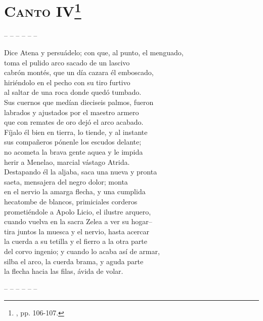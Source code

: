 \section*{\centering\textbf{\textsc{Canto} IV}\footnote{\ehdos, pp. 106-107.}}
%
\noindent-- -- -- -- -- --\par
%
\beginnumbering
\pstart
{}
Dice Atena y persuádelo; con que, al punto, el menguado,\\
toma el pulido arco sacado de un lascivo\\
cabrón montés, que un día cazara él emboscado,\\
hiriéndolo en el pecho con su tiro furtivo\\
al saltar de una roca donde quedó tumbado.\\
Sus cuernos que medían dieciseis palmos, fueron\\
labrados y ajustados por el maestro armero\\
que con remates de oro dejó el arco acabado.\\
Fíjalo él bien en tierra, lo tiende, y al instante\\
sus compañeros pónenle los escudos delante;\\
no acometa la brava gente aquea y le impida\\
herir a Menelao, marcial vástago Atrida.\\
Destapando él la aljaba, saca una nueva y pronta\\
saeta, mensajera del negro dolor; monta\\
en el nervio la amarga flecha, y una cumplida\\
hecatombe de blancos, primiciales corderos\\
prometiéndole a Apolo Licio, el ilustre arquero,\\
cuando vuelva en la sacra Zelea a ver su hogar--\\
tira juntos la muesca y el nervio, hasta acercar\\
la cuerda a su tetilla y el fierro a la otra parte\\
del corvo ingenio; y cuando lo acaba así de armar,\\
silba el arco, la cuerda brama, y aguda parte\\
la flecha hacia las filas, ávida de volar.\par
\pend
\endnumbering
%
\noindent-- -- -- -- -- --\par